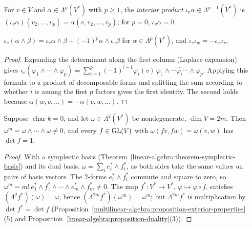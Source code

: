 \begin{definition}\label{multilinear-algebra:definition-interior-product}
For $v \in V$ and $\alpha \in \Lambda^p(V^*)$ with $p \geq 1$, the \emph{interior product} $\iota_v\alpha \in \Lambda^{p-1}(V^*)$ is
$(\iota_v\alpha)(v_2, \ldots, v_p) = \alpha(v, v_2, \ldots, v_p)$; for $p = 0$, $\iota_v\alpha = 0$.
\end{definition}

\begin{proposition}\label{multilinear-algebra:proposition-interior-antiderivation}
$\iota_v(\alpha \wedge \beta) = \iota_v\alpha \wedge \beta + (-1)^p\alpha \wedge \iota_v\beta$ for $\alpha \in \Lambda^p(V^*)$, and
$\iota_v \iota_w = -\iota_w\iota_v$.
\end{proposition}

\begin{proof}
Expanding the determinant along the first column (Laplace expansion) gives
$\iota_v(\varphi_1 \wedge \cdots \wedge \varphi_p) = \sum_{i=1}^p (-1)^{i-1}\varphi_i(v)\,\varphi_1 \wedge \cdots \widehat{\varphi_i} \cdots \wedge \varphi_p$.
Applying this formula to a product of decomposable forms and splitting the sum according to whether $i$ is
among the first $p$ factors gives the first identity. The second holds because $\alpha(w, v, \ldots) = -\alpha(v, w, \ldots)$.
\end{proof}

\begin{proposition}\label{multilinear-algebra:proposition-symplectic-determinant}
Suppose $\operatorname{char} k = 0$, and let $\omega \in \Lambda^2(V^*)$ be nondegenerate, $\dim V = 2m$. Then
$\omega^m = \omega \wedge \cdots \wedge \omega \neq 0$, and every $f \in \mathrm{GL}(V)$ with $\omega(fv, fw) = \omega(v, w)$ has $\det f = 1$.
\end{proposition}

\begin{proof}
With a symplectic basis (Theorem~\ref{linear-algebra:theorem-symplectic-basis}) and its dual basis,
$\omega = \sum_i e_i^* \wedge f_i^*$, as both sides take the same values on pairs of basis vectors. The $2$-forms
$e_i^* \wedge f_i^*$ commute and square to zero, so $\omega^m = m!\, e_1^* \wedge f_1^* \wedge \cdots \wedge e_m^* \wedge f_m^* \neq 0$.
The map $f^* \colon V^* \to V^*$, $\varphi \mapsto \varphi \circ f$, satisfies $(\Lambda^2 f^*)(\omega) = \omega$, hence
$(\Lambda^{2m}f^*)(\omega^m) = \omega^m$; but $\Lambda^{2m}f^*$ is multiplication by $\det f^* = \det f$
(Proposition~\ref{multilinear-algebra:proposition-exterior-properties}(5) and
Proposition~\ref{linear-algebra:proposition-duality}(3)).
\end{proof}

